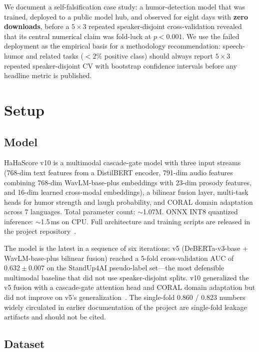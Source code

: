 \documentclass[11pt, letterpaper]{article}
\begin{document}
We document a self-falsification case study: a humor-detection model that was
trained, deployed to a public model hub, and observed for eight days with
\textbf{zero downloads}, before a $5\times3$ repeated speaker-disjoint
cross-validation revealed that its central numerical claim was fold-luck at
$p < 0.001$. We use the failed deployment as the empirical basis for a
methodology recommendation: speech-humor and related tasks ($<2\%$ positive
class) should always report $5\times3$ repeated speaker-disjoint CV with
bootstrap confidence intervals before any headline metric is published.

\section{Setup}

\subsection{Model}

HaHaScore v10 is a multimodal cascade-gate model with three input streams
(768-dim text features from a DistilBERT encoder, 791-dim audio features
combining 768-dim WavLM-base-plus embeddings with 23-dim prosody features, and
16-dim learned cross-modal embeddings), a bilinear fusion layer, multi-task
heads for humor strength and laugh probability, and CORAL domain adaptation
across 7 languages. Total parameter count: $\sim$1.07M. ONNX INT8 quantized
inference: $\sim$1.5\,ms on CPU. Full architecture and training scripts are
released in the project repository~\cite{hahascore-repo}.

The model is the latest in a sequence of six iterations: v5 (DeBERTa-v3-base
+ WavLM-base-plus bilinear fusion) reached a 5-fold cross-validation AUC of
$0.632 \pm 0.007$ on the StandUp4AI pseudo-label set---the most defensible
multimodal baseline that did not use speaker-disjoint splits. v10
generalized the v5 fusion with a cascade-gate attention head and CORAL
domain adaptation but did not improve on v5's generalization~\cite{v5ref}.
The single-fold 0.860 / 0.823 numbers widely circulated in earlier
documentation of the project are single-fold leakage artifacts and should
not be cited.

\subsection{Dataset}
\end{document}
